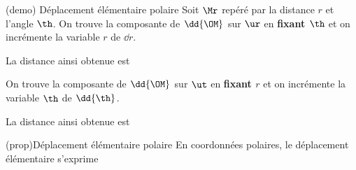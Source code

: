 \documentclass[../../main/main.tex]{subfiles}
\begin{document}
\begin{tcb*}[sidebyside, righthand ratio=.25](demo)
	{Déplacement élémentaire polaire}
	Soit $\Mr$ repéré par la distance $r$ et l'angle $\th$. On trouve
	la composante de $\dd{\OM}$ sur $\ur$ en \textbf{fixant $\th$} et on incrémente
	la variable $r$ de $\dd{r}$.
	\begin{center}
		La distance ainsi obtenue est 
	\end{center}
	\bigbreak
	On trouve la composante de $\dd{\OM}$ sur $\ut$ en \textbf{fixant $r$} et on
	incrémente la variable $\th$ de $\dd{\th}$.
	\begin{center}
		La distance ainsi obtenue est 
	\end{center}
	\tcblower
	\begin{center}
		\captionsetup{justification=centering}
	\end{center}
\end{tcb*}

\begin{tcb*}(prop){Déplacement élémentaire polaire}
	En coordonnées polaires, le déplacement élémentaire s'exprime
	\psw{\[\boxed{\dd\OM = \dd r\ur + r\dd\th\ut}\]}
	\vspace{-15pt}
\end{tcb*}
\end{document}
